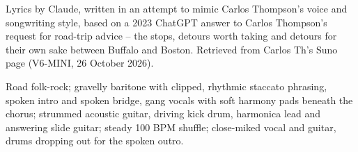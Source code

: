 
\begin{notes}
Lyrics by Claude, written in an attempt to mimic Carlos Thompson's voice and songwriting style, based on a 2023 ChatGPT answer to Carlos Thompson's request for road-trip advice -- the stops, detours worth taking and detours for their own sake between Buffalo and Boston. Retrieved from Carlos Th's Suno page (V6-MINI, 26 October 2026).
\end{notes}
\begin{style}
Road folk-rock; gravelly baritone with clipped, rhythmic staccato phrasing, spoken intro and spoken bridge, gang vocals with soft harmony pads beneath the chorus; strummed acoustic guitar, driving kick drum, harmonica lead and answering slide guitar; steady 100 BPM shuffle; close-miked vocal and guitar, drums dropping out for the spoken outro.
\end{style}
